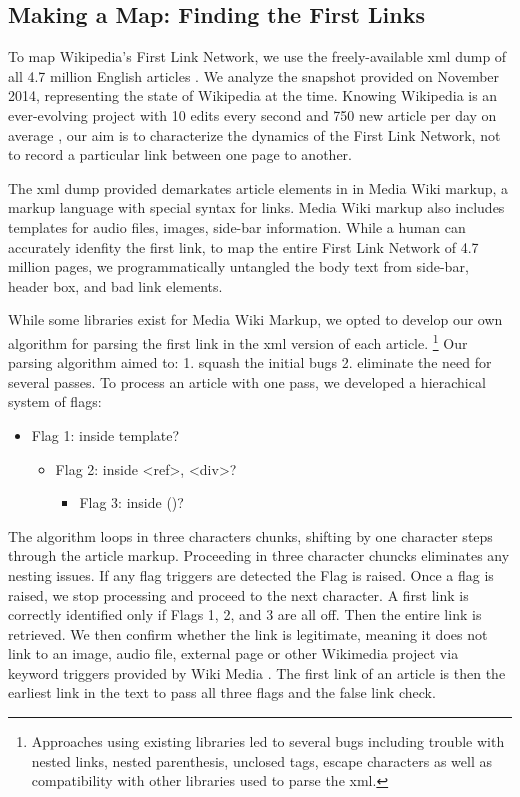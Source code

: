 \documentclass[twoside]{article}
\begin{document}
\begin{multicols}{2}
\section{Making a Map: Finding the First Links}
To map Wikipedia's First Link Network, we use the freely-available xml dump of all 4.7 million English articles \cite{2}. We analyze the snapshot provided on November 2014, representing the state of Wikipedia at the time. Knowing Wikipedia is an ever-evolving project with 10 edits every second and 750 new article per day on average \cite{3}, our aim is to characterize the dynamics of the First Link Network, not to record a particular link between one page to another. 

The xml dump provided demarkates article elements in in Media Wiki markup, a markup language with special syntax for links. 
Media Wiki markup also includes templates for audio files, images, side-bar information.
While a human can accurately idenfity the first link, to map the entire First Link Network of 4.7 million pages, we programmatically untangled the body text from side-bar, header box, and bad link elements.

While some libraries exist for Media Wiki Markup, we opted to develop our own algorithm for parsing the first link in the xml version of each article. 
\footnote{Approaches using existing libraries led to several bugs including trouble with nested links, nested parenthesis, unclosed tags, escape characters as well as compatibility with other libraries used to parse the xml.}
Our parsing algorithm aimed to: 1. squash the initial bugs 2. eliminate the need for several passes. To process an article with one pass, we developed a hierachical system of flags:
\begin{itemize}
    \item Flag 1: inside template?
    \begin{itemize}
        \item Flag 2: inside <ref>, <div>?
        \begin{itemize}
            \item Flag 3: inside ()?
        \end{itemize}
    \end{itemize}
\end{itemize}

The algorithm loops in three characters chunks, shifting by one character steps through the article markup. Proceeding in three character chuncks eliminates any nesting issues. If any flag triggers are detected the Flag is raised. Once a flag is raised, we stop processing and proceed to the next character. A first link is correctly identified only if Flags 1, 2, and 3 are all off. Then the entire link is retrieved. We then confirm whether the link is legitimate, meaning it does not link to an image, audio file, external page or other Wikimedia project via keyword triggers provided by Wiki Media \cite{4}. The first link of an article is then the earliest link in the text to pass all three flags and the false link check.



\end{multicols}
\end{document}
